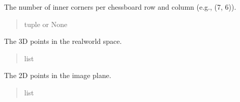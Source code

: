 \documentclass[letterpaper,10pt,english]{sphinxmanual}
\begin{document}
\begin{fulllineitems}
\begin{fulllineitems}
\label{\detokenize{CameraUtils:CameraUtils.Camera.chessboard_size}}
\pysigstartsignatures
{}
\pysigstopsignatures
\sphinxAtStartPar
The number of inner corners per chessboard row and column (e.g., (7, 6)).
\begin{quote}\begin{description}
\sphinxAtStartPar
tuple or None

\end{description}\end{quote}

\end{fulllineitems}


\begin{fulllineitems}
\label{\detokenize{CameraUtils:CameraUtils.Camera.obj_points}}
\pysigstartsignatures
{}
\pysigstopsignatures
\sphinxAtStartPar
The 3D points in the real\sphinxhyphen{}world space.
\begin{quote}\begin{description}
\sphinxAtStartPar
list

\end{description}\end{quote}

\end{fulllineitems}


\begin{fulllineitems}
\label{\detokenize{CameraUtils:CameraUtils.Camera.img_points}}
\pysigstartsignatures
{}
\pysigstopsignatures
\sphinxAtStartPar
The 2D points in the image plane.
\begin{quote}\begin{description}
\sphinxAtStartPar
list

\end{description}\end{quote}

\end{fulllineitems}


\end{fulllineitems}
\end{document}
